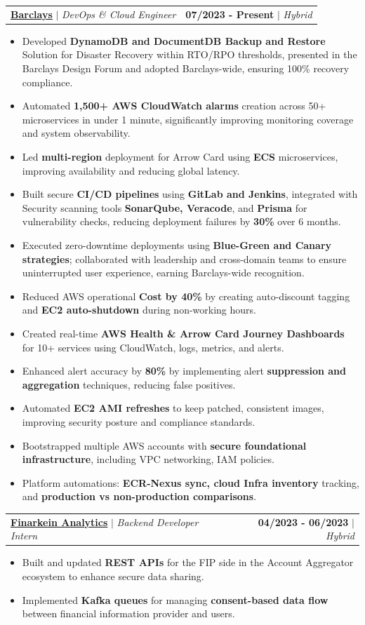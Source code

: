 \documentclass[letterpaper,11pt]{article}
\makeatletter
\newcommand{\resumeItem}[1]{
  \item\small{
    {#1 \vspace{-2pt}}
  }
}
\newcommand{\resumeSubheading}[4]{
  \vspace{-2pt}\item
    \begin{tabular*}{1.0\textwidth}[t]{l@{\extracolsep{\fill}}r}
      \textbf{#3} $|$ \textit{\small#1} & \textbf{\small #2} $|$ \textit{\small #4} \\
    \end{tabular*}\vspace{-8pt}
}
\newcommand{\resumeItemListStart}{\begin{itemize}[leftmargin=*]}
\newcommand{\resumeItemListEnd}{\end{itemize}}
\makeatother
\begin{document}
  \resumeSubheading
    {DevOps \& Cloud Engineer}{07/2023 - Present}
    {\href{https://home.barclays//}{\textbf{Barclays}}}{Hybrid}
    \resumeItemListStart
      \resumeItem{Developed \textbf{DynamoDB and DocumentDB Backup and Restore} Solution for Disaster Recovery within RTO/RPO thresholds, presented in the Barclays Design Forum and adopted Barclays-wide, ensuring 100\% recovery compliance.}
      \resumeItem{Automated \textbf{1,500+ AWS CloudWatch alarms} creation across 50+ microservices in under 1 minute, significantly improving monitoring coverage and system observability.}
      \resumeItem{Led \textbf{multi-region} deployment for Arrow Card using \textbf{ECS} microservices, improving availability and reducing global latency.}
      \resumeItem{Built secure \textbf{CI/CD pipelines} using \textbf{GitLab and Jenkins}, integrated with  Security scanning tools \textbf{SonarQube, Veracode}, and \textbf{Prisma} for vulnerability checks, reducing deployment failures by \textbf{30\%} over 6 months.}
      \resumeItem{Executed zero-downtime deployments using \textbf{Blue-Green and Canary strategies}; collaborated with leadership and cross-domain teams to ensure uninterrupted user experience, earning Barclays-wide recognition.}
      \resumeItem{Reduced AWS operational \textbf{Cost by 40\%} by creating auto-discount tagging and \textbf{EC2 auto-shutdown} during non-working hours.}
      \resumeItem{Created real-time \textbf{AWS Health \& Arrow Card Journey Dashboards} for 10+ services using CloudWatch, logs, metrics, and alerts.}
      \resumeItem{Enhanced alert accuracy by \textbf{80\%} by implementing alert \textbf{suppression and aggregation} techniques, reducing false positives.}
      \resumeItem{Automated \textbf{EC2 AMI refreshes} to keep patched, consistent images, improving security posture and compliance standards.}
      \resumeItem{Bootstrapped multiple AWS accounts with \textbf{secure foundational infrastructure}, including VPC networking, IAM policies.}
      \resumeItem{Platform automations: \textbf{ECR-Nexus sync, cloud Infra inventory} tracking, and \textbf{production vs non-production comparisons}.}
    \resumeItemListEnd

  \resumeSubheading
    {Backend Developer Intern}{04/2023 - 06/2023}
    {\href{https://finarkein.com/}{Finarkein Analytics}}{Hybrid}
    \resumeItemListStart
      \resumeItem{Built and updated \textbf{REST APIs} for the FIP side in the Account Aggregator ecosystem to enhance secure data sharing.}
      \resumeItem{Implemented \textbf{Kafka queues} for managing \textbf{consent-based data flow} between financial information provider and users.}
    \resumeItemListEnd
\end{document}
